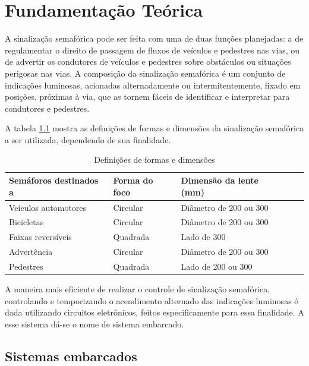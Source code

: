 \chapter{Fundamentação Teórica}

A sinalização semafórica pode ser feita com uma de duas funções planejadas: a de regulamentar o direito de passagem de fluxos de veículos e pedestres nas vias, ou de advertir os condutores de veículos e pedestres sobre obstáculos ou situações perigosas nas vias. A composição da sinalização semafórica é um conjunto de indicações luminosas, acionadas alternadamente ou intermitentemente, fixado em posições, próximas à via, que as tornem fáceis de identificar e interpretar para condutores e pedestres. 

A tabela \ref{tab: focos} mostra as definições de formas e dimensões da sinalização semafórica a ser utilizada, dependendo de sua finalidade.

\begin{table}[H]
\centering
\caption{Definições de formas e dimensões}
\label{tab: focos}
\begin{tabular}{@{}lllll@{}}
\toprule
Semáforos destinados a & Forma do foco & Dimensão da lente (mm) \\ \midrule
Veículos automotores & Circular & Diâmetro de 200 ou 300 \\
Bicicletas & Circular & Diâmetro de 200 ou 300 \\
Faixas reversíveis          &	Quadrada & Lado de 300		  \\
Advertência & Circular & Diâmetro de 200 ou 300 \\
Pedestres & Quadrada & Lado de 200 ou 300 \\
\bottomrule
\end{tabular}
\end{table}

A maneira mais eficiente de realizar o controle de sinalização semafórica, controlando e temporizando o acendimento alternado das indicações luminosas é dada utilizando circuitos eletrônicos, feitos especificamente para essa finalidade. A esse sistema dá-se o nome de sistema embarcado. 

\section{Sistemas embarcados}

